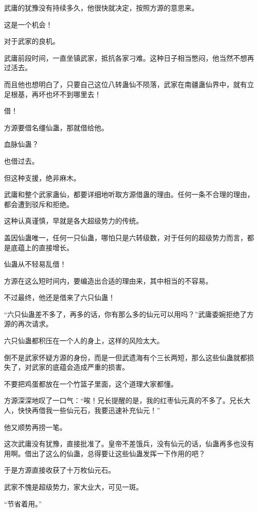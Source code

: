 
\begin{this_body}

武庸的犹豫没有持续多久，他很快就决定，按照方源的意思来。

这是一个机会！

对于武家的良机。

武庸前段时间，一直坐镇武家，抵抗各家刁难。这种日子相当憋闷，他当然不想再过活去。

而且他也想明白了，只要自己这位八转蛊仙不陨落，武家在南疆蛊仙界中，就有立足根基，再坏也坏不到哪里去！

借！

方源要借名缰仙蛊，那就借给他。

血脉仙蛊？

也借过去。

但这种支援，绝非麻木。

武庸和整个武家蛊仙，都要详细地听取方源借蛊的理由。任何一条不合理的理由，都会遭到驳斥和拒绝。

这种认真谨慎，早就是各大超级势力的传统。

盖因仙蛊唯一，任何一只仙蛊，哪怕只是六转级数，对于任何的超级势力而言，都是底蕴上的直接增长。

仙蛊从不轻易乱借！

方源在这么短时间内，要编造出合适的理由来，其中相当的不容易。

不过最终，他还是借来了六只仙蛊！

“六只仙蛊差不多了，再多的话，你有那么多的仙元可以用吗？”武庸委婉拒绝了方源的再次请求。

六只仙蛊都积压在一个人的身上，这样的风险太大。

倒不是武家怀疑方源的身份，而是一但武遗海有个三长两短，那么这些仙蛊就都损失了，对武家的底蕴会造成严重的损害。

不要把鸡蛋都放在一个竹篮子里面，这个道理大家都懂。

方源深深地叹了一口气：“唉！兄长提醒的是，我的红枣仙元真的不多了。兄长大人，快快再借我一些仙元石，我要迅速补充仙元！”

他又顺势再捞一笔。

这次武庸没有犹豫，直接批准了。皇帝不差饿兵，没有仙元的话，仙蛊再多也没有用啊。借出了这么的仙蛊，总得要让这些仙蛊发挥一下作用的吧？

于是方源直接收获了十万枚仙元石。

武家不愧是超级势力，家大业大，可见一斑。

“节省着用。”


\end{this_body}
